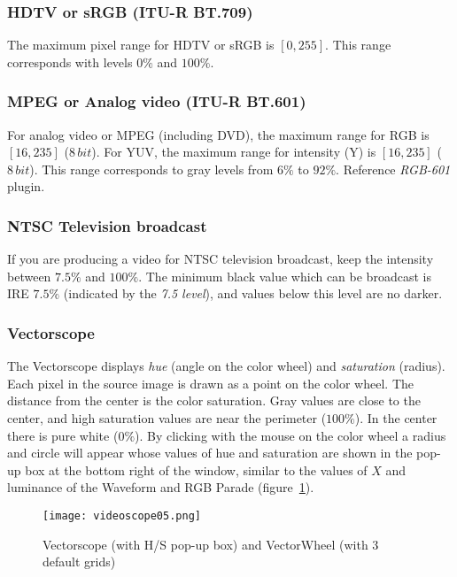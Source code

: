 \subsubsection*{HDTV or sRGB (ITU-R BT.709)}%
\label{ssub:hdtv_srgb_bt709}

The maximum pixel range for HDTV or sRGB is $[0, 255]$. This range corresponds with levels $0\%$ and $100\%$.

\subsubsection*{MPEG or Analog video (ITU-R BT.601)}%
\label{ssub:mpeg_analog_video_bt601}

For analog video or MPEG (including DVD), the maximum range for RGB is $[16, 235]$ ($8\, bit$). For YUV, the maximum range for intensity (Y) is $[16, 235]$ ($8\, bit$). This range corresponds to gray levels from $6\%$ to $92\%$. Reference \textit{RGB-601} plugin.

\subsubsection*{NTSC Television broadcast}%
\label{ssub:ntsc_television_broadcast}

If you are producing a video for NTSC television broadcast, keep the intensity between $7.5\%$ and $100\%$. The minimum black value which can be broadcast is IRE $7.5\%$ (indicated by the \textit{7.5 level}), and values below this level are no darker.

\subsubsection*{Vectorscope}%
\label{ssub:Vectorscope}

The Vectorscope displays \textit{hue} (angle on the color wheel) and \textit{saturation} (radius). Each pixel in the source image is drawn as a point on the color wheel. The distance from the center is the color saturation. Gray values are close to the center, and high saturation values are near the perimeter ($100\%$). In the center there is pure white ($0\%$). By clicking with the mouse on the color wheel a radius and circle will appear whose values of hue and saturation are shown in the  pop-up box at the bottom right of the window, similar to the values of $X$ and luminance of the Waveform and RGB Parade (figure~\ref{fig:videoscope05}).

\begin{figure}[hbtp]
	\centering
	\texttt{[image: videoscope05.png]}
	\caption{Vectorscope (with H/S pop-up box) and VectorWheel (with 3 default grids)}
	\label{fig:videoscope05}
\end{figure}

